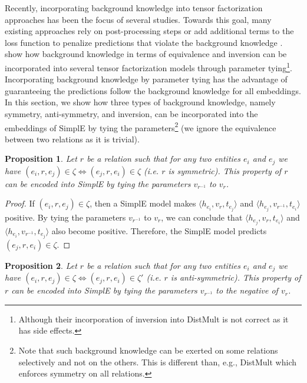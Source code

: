 \documentclass{article}
\newcommand{\triple}[3]{(\mathit{#1}, \mathit{#2}, \mathit{#3})}
\newtheorem{proposition}{Proposition}
\begin{document}
Recently, incorporating background knowledge into tensor factorization approaches has been the focus of several studies. Towards this goal, many existing approaches rely on post-processing steps or add additional terms to the loss function to penalize predictions that violate the background knowledge \cite{rocktaschel2014low,wang2015knowledge,wei2015large,guo2016jointly,ding2018improving}.  \citet{minervini2017regularizing} show how background knowledge in terms of equivalence and inversion can be incorporated into several tensor factorization models through parameter tying\footnote{Although their incorporation of inversion into DistMult is not correct as it has side effects.}. Incorporating background knowledge by parameter tying has the advantage of guaranteeing the predictions follow the background knowledge for all embeddings.
In this section, we show how three types of background knowledge, namely symmetry, anti-symmetry, and inversion, can be incorporated into the embeddings of SimplE by tying the parameters\footnote{Note that such background knowledge can be exerted on some relations selectively and not on the others. This is different than, e.g., DistMult which enforces symmetry on all relations.} (we ignore the equivalence between two relations as it is trivial).

\begin{proposition} \label{expert-prop1}
Let $r$ be a relation such that for any two entities $e_i$ and $e_j$ we have $\triple{e_i}{r}{e_j}\in\zeta \iff \triple{e_j}{r}{e_i}\in\zeta$ (i.e. $r$ is symmetric). This property of $r$ can be encoded into SimplE by tying the parameters $v_{r^{-1}}$ to $v_r$.
\end{proposition}

\begin{proof}
If $\triple{e_i}{r}{e_j}\in\zeta$, then a SimplE model makes $\langle h_{e_i}, v_r, t_{e_j} \rangle$ and $\langle h_{e_j}, v_{r^{-1}}, t_{e_i} \rangle$ positive. By tying the parameters $v_{r^{-1}}$ to $v_r$, we can conclude that $\langle h_{e_j}, v_r, t_{e_i} \rangle$ and $\langle h_{e_i}, v_{r^{-1}}, t_{e_j} \rangle$ also become positive. Therefore, the SimplE model predicts $\triple{e_j}{r}{e_i}\in\zeta$.
\end{proof}

\begin{proposition} \label{expert-prop2}
Let $r$ be a relation such that for any two entities $e_i$ and $e_j$ we have $\triple{e_i}{r}{e_j}\in\zeta \iff  \triple{e_j}{r}{e_i} \in \zeta'$ (i.e. $r$ is anti-symmetric). This property of $r$ can be encoded into SimplE by tying the parameters $v_{r^{-1}}$ to the negative of $v_r$.
\end{proposition}
\end{document}
